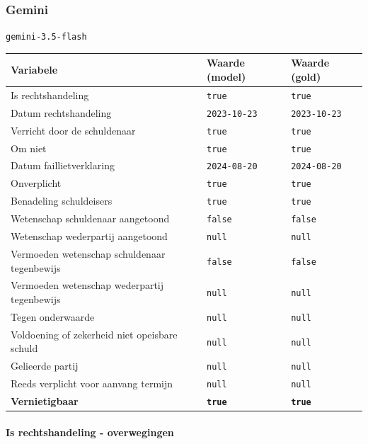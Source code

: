\documentclass[
  dutch,
  a4paper,
]{article}
\begin{document}
\newpage


\subsubsection{Gemini}\label{gemini-10}

\texttt{gemini-3.5-flash}

\begin{center}
\small
\begin{tabular}{@{}p{7.4cm}p{2.6cm}p{2.6cm}@{}}
\toprule
Variabele & Waarde (model) & Waarde (gold) \\
\midrule
Is rechtshandeling & \texttt{true} & \texttt{true} \\
Datum rechtshandeling & \texttt{2023-10-23} & \texttt{2023-10-23} \\
Verricht door de schuldenaar & \texttt{true} & \texttt{true} \\
Om niet & \texttt{true} & \texttt{true} \\
Datum faillietverklaring & \texttt{2024-08-20} & \texttt{2024-08-20} \\
Onverplicht & \texttt{true} & \texttt{true} \\
Benadeling schuldeisers & \texttt{true} & \texttt{true} \\
Wetenschap schuldenaar aangetoond & \texttt{false} & \texttt{false} \\
Wetenschap wederpartij aangetoond & \texttt{null} & \texttt{null} \\
Vermoeden wetenschap schuldenaar tegenbewijs & \texttt{false} & \texttt{false} \\
Vermoeden wetenschap wederpartij tegenbewijs & \texttt{null} & \texttt{null} \\
Tegen onderwaarde & \texttt{null} & \texttt{null} \\
Voldoening of zekerheid niet opeisbare schuld & \texttt{null} & \texttt{null} \\
Gelieerde partij & \texttt{null} & \texttt{null} \\
Reeds verplicht voor aanvang termijn & \texttt{null} & \texttt{null} \\
\textbf{Vernietigbaar} & \textbf{\texttt{true}} & \textbf{\texttt{true}} \\
\bottomrule
\end{tabular}
\end{center}

\paragraph{Is rechtshandeling - overwegingen}\label{is-rechtshandeling---overwegingen-32}
\end{document}
